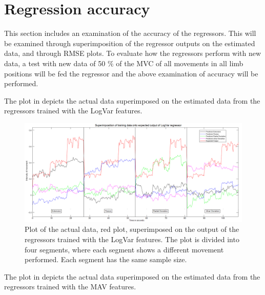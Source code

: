 \section{Regression accuracy}
This section includes an examination of the accuracy of the regressors. This will be examined through superimposition of the regressor outputs on the estimated data, and through RMSE plots. To evaluate how the regressors perform with new data, a test with new data of 50 $\%$ of the MVC of all movements in all limb positions will be fed the regressor and the above examination of accuracy will be performed. 

The plot in  depicts the actual data superimposed on the estimated data from the regressors trained with the LogVar features. 

\begin{figure}[H]
	\includegraphics[width=1\textwidth]{figures/results/SuperPositionTestDataLogVar}  %
	\caption{Plot of the actual data, red plot, superimposed on the output of the regressors trained with the LogVar features. The plot is divided into four segments, where each segment shows a different movement performed. Each segment has the same sample size.}
	\label{fig:SuperPositionTestDataLogVar}  %
\end{figure}

The plot in  depicts the actual data superimposed on the estimated data from the regressors trained with the MAV features. 

